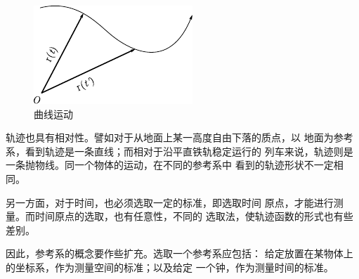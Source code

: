 \begin{figure}
    \centering
    \includegraphics{figure/fig01.09}
    \caption{曲线运动}
    \label{fig:01.09}
\end{figure}
轨迹也具有相对性。譬如对于从地面上某一高度自由下落的质点，以
地面为参考系，看到轨迹是一条直线；而相对于沿平直铁轨稳定运行的
列车来说，轨迹则是一条抛物线。同一个物体的运动，在不同的参考系中
看到的轨迹形状不一定相同。

另一方面，对于时间，也必须选取一定的标准，即选取时间
原点，才能进行测量。而时间原点的选取，也有任意性，不同的
选取法，使轨迹函数的形式也有些差别。

因此，参考系的概念要作些扩充。选取一个参考系应包括：
给定放置在某物体上的坐标系，作为测量空间的标准；以及给定
一个钟，作为测量时间的标准。